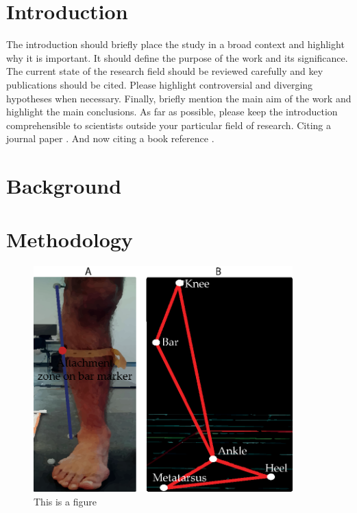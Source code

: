 \documentclass[journal,article,submit,moreauthors,pdftex,10pt,a4paper]{mdpi}
\theoremstyle{mdpi}
\newcounter{ex}
\newcounter{re}
\theoremstyle{mdpidefinition}
\begin{document}



\section{Introduction}

The introduction should briefly place the study in a broad context and highlight why it is important. It should define the purpose of the work and its significance. The current state of the research field should be reviewed carefully and key publications should be cited. Please highlight controversial and diverging hypotheses when necessary. Finally, briefly mention the main aim of the work and highlight the main conclusions. As far as possible, please keep the introduction comprehensible to scientists outside your particular field of research. Citing a journal paper \cite{ref-journal}. And now citing a book reference \cite{ref-book}.

\section{Background}

\section{Methodology}

\begin{figure}[H]
\centering
\includegraphics[width=10cm]{Markers_position.eps}
\caption{This is a figure}
\end{figure}   
\end{document}
